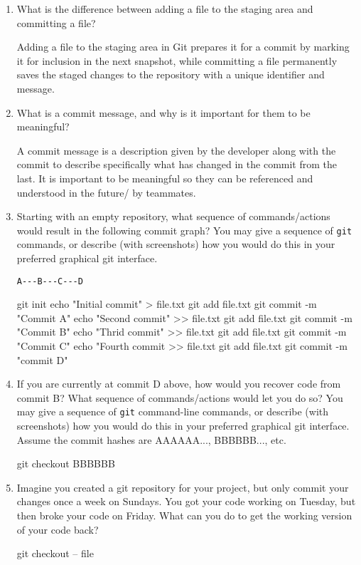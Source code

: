\documentclass[10pt,twocolumn]{article}
\begin{document}
\begin{enumerate}
\item What is the difference between adding a file to the staging area and committing a file?

Adding a file to the staging area in Git prepares it for a commit by marking it for inclusion in the next snapshot, while committing a file permanently saves the staged changes to the repository with a unique identifier and message.

\item What is a commit message, and why is it important for them to be meaningful?

A commit message is a description given by the developer along with the commit to describe specifically what has changed in the commit from the last. It is important to be meaningful so they can be referenced and understood in the future/ by teammates.

\item Starting with an empty repository, what sequence of commands/actions would result in the following commit graph? You may give a sequence of \texttt{git} commands, or describe (with screenshots) how you would do this in your preferred graphical git interface.
\begin{verbatim}
A---B---C---D
\end{verbatim}

git init
echo "Initial commit" > file.txt
git add file.txt
git commit -m "Commit A"
echo "Second commit" >> file.txt
git add file.txt
git commit -m "Commit B"
echo "Thrid commit" >> file.txt
git add file.txt
git commit -m "Commit C"
echo "Fourth commit >> file.txt
git add file.txt
git commit -m "commit D"


\item If you are currently at commit D above, how would you recover code from commit B? What sequence of commands/actions would let you do so? You may give a sequence of \texttt{git} command-line commands, or describe (with screenshots) how you would do this in your preferred graphical git interface. Assume the commit hashes are AAAAAA..., BBBBBB..., etc.

git checkout BBBBBB


\item Imagine you created a git repository for your project, but only commit your changes once a week on Sundays. You got your code working on Tuesday, but then broke your code on Friday. What can you do to get the working version of your code back?

git checkout -- file


\end{enumerate}
\end{document}
